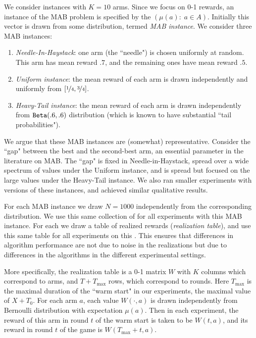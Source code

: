 \documentclass[../competing_bandits.tex]{subfiles}
\begin{document}

We consider instances with $K=10$ arms. Since we focus on 0-1 rewards, an instance of the MAB problem is specified by the \emph{\MRV} $(\mu(a):\; a\in A)$. Initially this vector is drawn from some distribution, termed \emph{MAB instance}. We consider three MAB instances:
\begin{enumerate}
\item \emph{Needle-In-Haystack}: one arm (the ``needle") is chosen uniformly at random. This arm has mean reward $.7$, and the remaining ones have mean reward $.5$.

\item \emph{Uniform instance}: the mean reward of each arm is drawn independently and uniformly from $[\nicefrac{1}{4}, \nicefrac{3}{4}]$.
\item \emph{Heavy-Tail instance}: the mean reward of each arm is drawn independently from $\mathtt{Beta}(.6,.6)$ distribution (which is known to have substantial ``tail probabilities").
\end{enumerate}
We argue that these MAB instances are (somewhat) representative. Consider the ``gap" between the best and the second-best arm, an essential parameter in the literature on MAB. The ``gap" is fixed in Needle-in-Haystack, spread over a wide spectrum of values under the Uniform instance, and is spread but  focused on the large values under the Heavy-Tail instance. We also ran smaller experiments with versions of these instances, and achieved similar qualitative results.

For each MAB instance we draw $N = 1000$ \MRVs independently from the corresponding distribution. We use this same collection of \MRVs for all experiments with this MAB instance. For each \MRV we draw a table of realized rewards (\emph{realization table}), and use this same table for all experiments on this \MRV. This ensures that differences in algorithm performance are not due to noise in the realizations but due to differences in the algorithms in the different experimental settings.

More specifically, the realization table is a 0-1 matrix $W$ with $K$ columns which correspond to arms, and $T+T_{\max}$ rows, which correspond to rounds. Here $T_{\max}$ is the maximal duration of the ``warm start" in our experiments, \ie the maximal value of $X+T_0$. For each arm $a$, each value $W(\cdot,a)$ is drawn independently from Bernoulli distribution with expectation $\mu(a)$. Then in each experiment, the reward of this arm in round $t$ of the warm start is taken to be $W(t,a)$, and its reward in round $t$ of the game is $W(T_{\max}+t,a)$.
\end{document}
